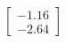 \documentclass[preview]{standalone}
\begin{document}
\begin{align*}
\begin{bmatrix} -1.16 \\ -2.64 \end{bmatrix}
\end{align*}
\end{document}
